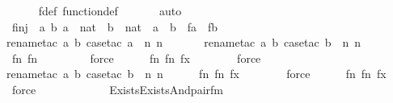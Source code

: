\begin{isabellebody}
\ \ \ \ \isamarkupfalse%
\ f{\isacharunderscore}{\kern0pt}def\ function{\isacharunderscore}{\kern0pt}def\ \isanewline
\ \ \ \ \isamarkupfalse%
\ auto\isanewline
\isanewline
\ \ \isamarkupfalse%
\ finj\ {\isacharcolon}{\kern0pt}\ {\isachardoublequoteopen}{\isasymAnd}a\ b{\isachardot}{\kern0pt}\ a\ {\isasymin}\ nat\ {\isasymLongrightarrow}\ b\ {\isasymin}\ nat\ {\isasymLongrightarrow}\ a\ {\isasymnoteq}\ b\ {\isasymLongrightarrow}\ f{\isacharbackquote}{\kern0pt}a\ {\isasymnoteq}\ f{\isacharbackquote}{\kern0pt}b{\isachardoublequoteclose}\ \isanewline
\ \ \ \ \isamarkupfalse%
{\isacharparenleft}{\kern0pt}rename{\isacharunderscore}{\kern0pt}tac\ a\ b{\isacharcomma}{\kern0pt}\ case{\isacharunderscore}{\kern0pt}tac\ {\isachardoublequoteopen}a\ {\isasymin}\ {\isacharbraceleft}{\kern0pt}n{\isacharcomma}{\kern0pt}\ n{\isacharprime}{\kern0pt}{\isacharbraceright}{\kern0pt}{\isachardoublequoteclose}{\isacharparenright}{\kern0pt}\ \isanewline
\ \ \ \ \ \isamarkupfalse%
{\isacharparenleft}{\kern0pt}rename{\isacharunderscore}{\kern0pt}tac\ a\ b{\isacharcomma}{\kern0pt}\ case{\isacharunderscore}{\kern0pt}tac\ {\isachardoublequoteopen}b\ {\isasymin}\ {\isacharbraceleft}{\kern0pt}n{\isacharcomma}{\kern0pt}\ n{\isacharprime}{\kern0pt}{\isacharbraceright}{\kern0pt}{\isachardoublequoteclose}{\isacharparenright}{\kern0pt}\isanewline
\ \ \ \ \isamarkupfalse%
\ fn\ fn{\isacharprime}{\kern0pt}\ \isanewline
\ \ \ \ \ \ \isamarkupfalse%
\ force\isanewline
\ \ \ \ \isamarkupfalse%
\ fn\ fn{\isacharprime}{\kern0pt}\ fx\isanewline
\ \ \ \ \ \ \isamarkupfalse%
\ force\ \isanewline
\ \ \ \ \ \isamarkupfalse%
{\isacharparenleft}{\kern0pt}rename{\isacharunderscore}{\kern0pt}tac\ a\ b{\isacharcomma}{\kern0pt}\ case{\isacharunderscore}{\kern0pt}tac\ {\isachardoublequoteopen}b\ {\isasymin}\ {\isacharbraceleft}{\kern0pt}n{\isacharcomma}{\kern0pt}\ n{\isacharprime}{\kern0pt}{\isacharbraceright}{\kern0pt}{\isachardoublequoteclose}{\isacharparenright}{\kern0pt}\isanewline
\ \ \ \ \isamarkupfalse%
\ fn\ fn{\isacharprime}{\kern0pt}\ fx\isanewline
\ \ \ \ \ \ \isamarkupfalse%
\ force\isanewline
\ \ \ \ \isamarkupfalse%
\ fn\ fn{\isacharprime}{\kern0pt}\ fx\isanewline
\ \ \ \ \isamarkupfalse%
\ force\isanewline
\ \ \ \ \isamarkupfalse%
\isanewline
\isanewline
\ \ \isamarkupfalse%
\ {\isasympsi}\ \ {\isachardoublequoteopen}{\isasympsi}\ {\isasymequiv}\ Exists{\isacharparenleft}{\kern0pt}Exists{\isacharparenleft}{\kern0pt}And{\isacharparenleft}{\kern0pt}pair{\isacharunderscore}{\kern0pt}fm{\isacharparenleft}{\kern0pt}{}{\isacharcomma}{\kern0pt}\ {}{\isacharcomma}{\kern0pt}\ {}{\isacharparenright}{\kern0pt}{\isacharcomma}{\kern0pt}\ \isanewline

\end{isabellebody}
